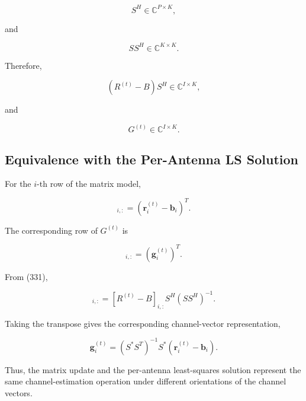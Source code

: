 \documentclass[12pt,a4paper]{article}
\begin{document}
\begin{equation}
S^H
\in
\mathbb C^{P\times K},
\tag{333}
\end{equation}

and

\begin{equation}
SS^H
\in
\mathbb C^{K\times K}.
\tag{334}
\end{equation}

Therefore,

\begin{equation}
(R^{(t)}-B)S^H
\in
\mathbb C^{I\times K},
\tag{335}
\end{equation}

and

\begin{equation}
\boxed{
G^{(t)}
\in
\mathbb C^{I\times K}
}.
\tag{336}
\end{equation}

\subsection{Equivalence with the Per-Antenna LS Solution}

For the $i$-th row of the matrix model,

\begin{equation}
[R^{(t)}-B]_{i,:}
=
(\mathbf r_i^{(t)}-\mathbf b_i)^T.
\tag{337}
\end{equation}

The corresponding row of $G^{(t)}$ is

\begin{equation}
[G^{(t)}]_{i,:}
=
(\mathbf g_i^{(t)})^T.
\tag{338}
\end{equation}

From (331),

\begin{equation}
[G^{(t)}]_{i,:}
=
[R^{(t)}-B]_{i,:}
S^H
(SS^H)^{-1}.
\tag{339}
\end{equation}

Taking the transpose gives the corresponding channel-vector representation,

\begin{equation}
\mathbf g_i^{(t)}
=
(S^*S^T)^{-1}
S^*
(\mathbf r_i^{(t)}-\mathbf b_i).
\tag{340}
\end{equation}

Thus, the matrix update and the per-antenna least-squares solution represent the same channel-estimation operation under different orientations of the channel vectors.
\end{document}
